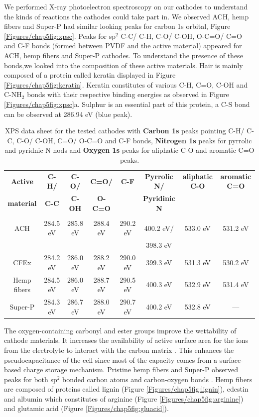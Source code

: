 We performed X-ray photoelectron spectroscopy on our cathodes to understand the kinds of reactions the cathodes could take part in. We observed ACH, hemp fibers and Super-P had similar looking peaks for carbon 1s orbital, Figure \ref{Figures/chap5fig:xpsc}. Peaks for sp$^2$ C-C/ C-H, C-O/ C-OH, O-C=O/ C=O and C-F bonds (formed between PVDF and the active material) appeared for ACH, hemp fibers and Super-P cathodes. To understand the presence of these bonds,we looked into the composition of these active materials. Hair is mainly composed of a protein called keratin displayed in Figure \ref{Figures/chap5fig:keratin}. Keratin constitutes of various C-H, C=O, C-OH and C-NH$_2$ bonds with their respective binding energies as observed in Figure \ref{Figures/chap5fig:xpsc}a. Sulphur is an essential part of this protein, a C-S bond can be observed at 286.94 eV (blue peak). 

\begin{table}
\caption{XPS data sheet for the tested cathodes with \textbf{Carbon 1s} peaks pointing C-H/ C-C, C-O/ C-OH, C=O/ O-C=O and C-F bonds, \textbf{Nitrogen 1s} peaks for pyrrolic and pyridnic N nods and \textbf{Oxygen 1s} peaks for aliphatic C-O and aromatic C=O peaks.} \label{table2}
\resizebox{\textwidth}{!}
{\begin{tabular}{|cccccccc|}
\hline
\textbf{Active} & \textbf{C-H/} & \textbf{C-O/} & \textbf{C=O/} & \textbf{C-F} & \textbf{Pyrrolic N/} & \textbf{aliphatic C-O} & \textbf{aromatic C=O}\\
\textbf{material} & \textbf{C-C} & \textbf{C-OH} & \textbf{O-C=O} & & \textbf{Pyridinic N} & & \\
\hline\\
ACH & 284.5 eV & 285.8 eV & 288.4 eV & 290.2 eV & 400.2 eV/ & 533.0 eV & 531.2 eV\\
& & & & & 398.3 eV & & \\
CFEx & 284.2 eV & 286.0 eV & 288.2 eV & 290.0 eV & 399.3 eV & 531.3 eV & 530.2 eV\\
Hemp fibers & 284.5 eV & 286.0 eV & 288.7 eV & 290.5 eV & 400.3 eV & 532.9 eV & 531.4 eV\\
Super-P & 284.3 eV & 286.7 eV & 288.0 eV & 290.7 eV & 400.2 eV & 532.8 eV & ---\\
\hline
\end{tabular}}
\end{table}

The oxygen-containing carbonyl and ester groups improve the wettability of cathode materials. It increases the availability of active surface area for the ions from the electrolyte to interact with the carbon matrix \cite{younesi_analysis_2015}. This enhances the pseudocapacitance of the cell since most of the capacity comes from a surface-based charge storage mechanism. Pristine hemp fibers and Super-P observed peaks for both sp$^2$ bonded carbon atoms and carbon-oxygen bonds \cite{hussain_development_2019}. Hemp fibers are composed of proteins called lignin (Figure \ref{Figures/chap5fig:lignin}), edestin and albumin which constitutes of arginine (Figure \ref{Figures/chap5fig:arginine}) and glutamic acid (Figure \ref{Figures/chap5fig:gluacid}).  

